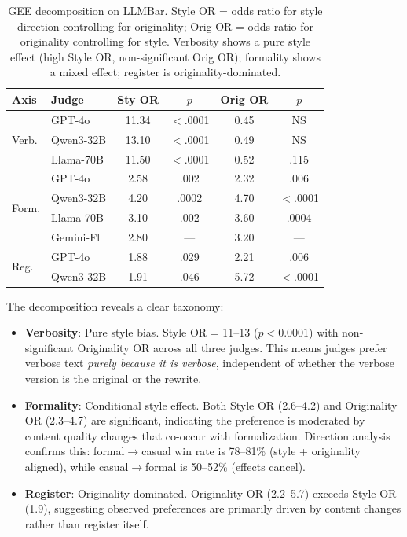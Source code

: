\documentclass[11pt]{article}
\begin{document}
\begin{table}[t]
\centering
\small
\setlength{\tabcolsep}{3pt}
\begin{tabular}{llcccc}
\toprule
\textbf{Axis} & \textbf{Judge} & \textbf{Sty OR} & \textbf{$p$} & \textbf{Orig OR} & \textbf{$p$} \\
\midrule
\multirow{3}{*}{Verb.}
& GPT-4o    & 11.34 & $<$.0001 & 0.45 & NS \\
& Qwen3-32B & 13.10 & $<$.0001 & 0.49 & NS \\
& Llama-70B & 11.50 & $<$.0001 & 0.52 & .115 \\
\midrule
\multirow{4}{*}{Form.}
& GPT-4o    & 2.58 & .002 & 2.32 & .006 \\
& Qwen3-32B & 4.20 & .0002 & 4.70 & $<$.0001 \\
& Llama-70B & 3.10 & .002 & 3.60 & .0004 \\
& Gemini-Fl & 2.80 & --- & 3.20 & --- \\
\midrule
\multirow{2}{*}{Reg.}
& GPT-4o    & 1.88 & .029 & 2.21 & .006 \\
& Qwen3-32B & 1.91 & .046 & 5.72 & $<$.0001 \\
\bottomrule
\end{tabular}
\caption{GEE decomposition on LLMBar. Style OR = odds ratio for style direction controlling for originality; Orig OR = odds ratio for originality controlling for style. Verbosity shows a pure style effect (high Style OR, non-significant Orig OR); formality shows a mixed effect; register is originality-dominated.}
\label{tab:gee}
\end{table}

The decomposition reveals a clear taxonomy:

\begin{itemize}
\item \textbf{Verbosity}: Pure style bias. Style OR = 11--13 ($p < 0.0001$) with non-significant Originality OR across all three judges. This means judges prefer verbose text \emph{purely because it is verbose}, independent of whether the verbose version is the original or the rewrite.

\item \textbf{Formality}: Conditional style effect. Both Style OR (2.6--4.2) and Originality OR (2.3--4.7) are significant, indicating the preference is moderated by content quality changes that co-occur with formalization. Direction analysis confirms this: formal$\rightarrow$casual win rate is 78--81\% (style + originality aligned), while casual$\rightarrow$formal is 50--52\% (effects cancel).

\item \textbf{Register}: Originality-dominated. Originality OR (2.2--5.7) exceeds Style OR (1.9), suggesting observed preferences are primarily driven by content changes rather than register itself.
\end{itemize}
\end{document}
